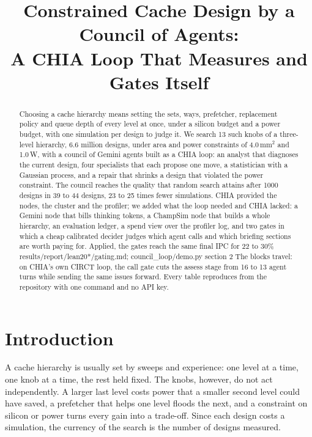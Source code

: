 \documentclass[conference]{IEEEtran}
\begin{document}
\title{Constrained Cache Design by a Council of Agents:\\A CHIA Loop That Measures and Gates Itself}

\author{}

\maketitle

\begin{abstract}
Choosing a cache hierarchy means setting the sets, ways, prefetcher, replacement policy and queue
depth of every level at once, under a silicon budget and a power budget, with one simulation per
design to judge it. We search 13 such knobs of a three-level hierarchy, 6.6 million designs,
under area and power constraints of 4.0\,mm$^2$ and 1.0\,W, with a council of Gemini agents
built as a CHIA loop: an analyst that diagnoses the current design, four specialists that each
propose one move, a statistician with a Gaussian process, and a repair that shrinks a design that
violated the power constraint. The council reaches the quality that random search attains after
1000 designs in 39 to 44 designs, 23 to 25 times fewer simulations. %
CHIA provided the nodes, the cluster and the profiler; we added what the loop needed and CHIA
lacked: a Gemini node that bills thinking tokens, a ChampSim node that builds a whole hierarchy,
an evaluation ledger, a spend view over the profiler log, and two gates in which a cheap
calibrated decider judges which agent calls and which briefing sections are worth paying for.
Applied, the gates reach the same final IPC for 22 to 30\% results/report/lean20*/gating.md; council_loop/demo.py section 2
The blocks travel: on CHIA's own CIRCT loop, the call gate cuts the assess stage from 16 to 13
agent turns while sending the same issues forward. %
Every table reproduces from the repository with one command and no API key.
\end{abstract}

\section{Introduction}
A cache hierarchy is usually set by sweeps and experience: one level at a time, one knob at a
time, the rest held fixed. The knobs, however, do not act independently. A larger last level
costs power that a smaller second level could have saved, a prefetcher that helps one level floods
the next, and a constraint on silicon or power turns every gain into a trade-off. Since each
design costs a simulation, the currency of the search is the number of designs measured.
\end{document}
